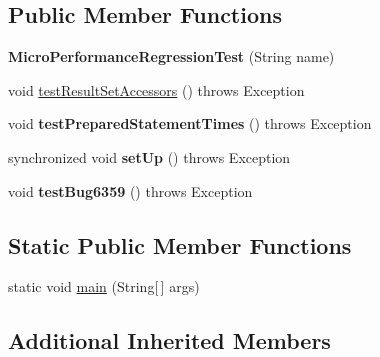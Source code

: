 \subsection*{Public Member Functions}
\begin{DoxyCompactItemize}
\item 
\mbox{\label{classtestsuite_1_1regression_1_1_micro_performance_regression_test_a2b35cb55f972980421a850026caf1982}} 
{\bfseries Micro\+Performance\+Regression\+Test} (String name)
\item 
void \mbox{\hyperlink{classtestsuite_1_1regression_1_1_micro_performance_regression_test_a1fa02a07cb865e21f5debd2b6cf58782}{test\+Result\+Set\+Accessors}} ()  throws Exception 
\item 
\mbox{\label{classtestsuite_1_1regression_1_1_micro_performance_regression_test_a075ad2c74ac9703c0b94555dcf77cfb7}} 
void {\bfseries test\+Prepared\+Statement\+Times} ()  throws Exception 
\item 
\mbox{\label{classtestsuite_1_1regression_1_1_micro_performance_regression_test_a020f1b11692f8a0a7e260e6f2b9978c0}} 
synchronized void {\bfseries set\+Up} ()  throws Exception 
\item 
\mbox{\label{classtestsuite_1_1regression_1_1_micro_performance_regression_test_ae9d82e480f78e01505f493317298cd14}} 
void {\bfseries test\+Bug6359} ()  throws Exception 
\end{DoxyCompactItemize}
\subsection*{Static Public Member Functions}
\begin{DoxyCompactItemize}
\item 
static void \mbox{\hyperlink{classtestsuite_1_1regression_1_1_micro_performance_regression_test_add1a6e74f7b15be05664993e779b93c4}{main}} (String\mbox{[}$\,$\mbox{]} args)
\end{DoxyCompactItemize}
\subsection*{Additional Inherited Members}


